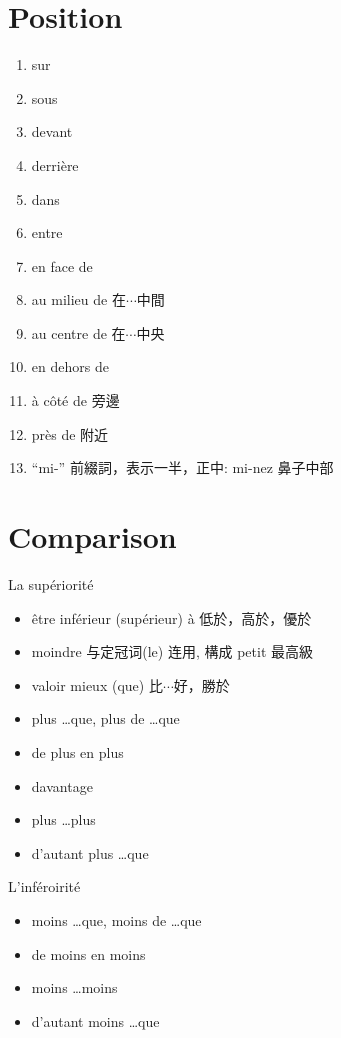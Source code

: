 \documentclass{book}
\begin{document}
    \section{Position}
        \begin{enumerate}
            \item sur
            \item sous
            \item devant
            \item derrière
            \item dans
            \item entre
            \item en face de
            \item au milieu de 在$\cdots$中間
            \item au centre de 在$\cdots$中央
            \item en dehors de
            \item à côté de 旁邊
            \item près de 附近
            \item ``mi-'' 前綴詞，表示一半，正中: mi-nez 鼻子中部
        \end{enumerate}
    
    \section{Comparison}
        La supériorité
        \begin{itemize}
            \item être inférieur (supérieur) à 低於，高於，優於
            \item moindre 与定冠词(le) 连用, 構成 petit 最高級
            \item valoir mieux (que) 比$\cdots$好，勝於
            \item plus \dots que, plus de \dots que
            \item de plus en plus
            \item davantage
            \item plus \dots plus
            \item d'autant plus \dots que
        \end{itemize}
        L'inféroirité
        \begin{itemize}
            \item moins \dots que, moins de \dots que
            \item de moins en moins
            \item moins \dots moins
            \item d'autant moins \dots que
        \end{itemize}
\end{document}
